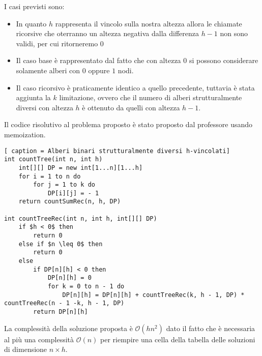 \documentclass[../cheatSheetAlgoritmi.tex]{subfiles}
\begin{document}
I casi previsti sono: 
\begin{itemize}
	\item In quanto $h$ rappresenta il vincolo sulla nostra altezza allora le chiamate ricorsive che oterranno un altezza negativa dalla differenza $h-1$ non sono validi, per cui ritorneremo $0$
	\item Il caso base è rappresentato dal fatto che con altezza $0$ si possono considerare solamente alberi con $0$ oppure $1$ nodi.
	\item Il caso ricorsivo è praticamente identico a quello precedente, tuttavia è stata aggiunta la $k$ limitazione, ovvero che il numero di alberi strutturalmente diversi con altezza $h$ è ottenuto da quelli con altezza $h - 1$.
\end{itemize}
Il codice risolutivo al problema proposto è stato proposto dal professore usando memoization. 
\begin{lstlisting}[ caption = Alberi binari strutturalmente diversi h-vincolati]
int countTree(int n, int h)
	int[][] DP = new int[1...n][1...h]
	for i = 1 to n do
		for j = 1 to k do
			DP[i][j] = - 1
	return countSumRec(n, h, DP)

int countTreeRec(int n, int h, int[][] DP)
	if $h < 0$ then
		return 0
	else if $n \leq 0$ then
		return 0
	else 
		if DP[n][h] < 0 then
			DP[n][h] = 0
			for k = 0 to n - 1 do
				DP[n][h] = DP[n][h] + countTreeRec(k, h - 1, DP) * countTreeRec(n - 1 -k, h - 1, DP)
		return DP[n][h]
\end{lstlisting}
La complessità della soluzione proposta è $\mathcal{O}(hn^2)$ dato il fatto che è necessaria al più una complessità $\mathcal{O}(n)$ per riempire una cella della tabella delle soluzioni di dimensione $n \times h$.
 
\end{document}
